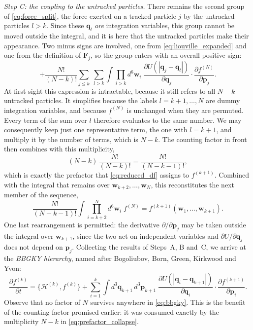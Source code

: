 \documentclass[12pt]{article}
\renewcommand{\vec}[1]{\bm{#1}}
\begin{document}
\emph{Step C: the coupling to the untracked particles.}  There remains
the second group of \eqref{eq:force_split}, the force exerted on a
tracked particle $j$ by the untracked particles $l>k$.  Since these
$\vec q_l$ \emph{are} integration variables, this group cannot be moved
outside the integral, and it is here that the untracked particles make
their appearance.  Two minus signs are involved, one from
\eqref{eq:liouville_expanded} and one from the definition of
$\vec F_j$, so the group enters with an overall positive sign:
%
\begin{equation}
  +\frac{N!}{(N-k)!}\sum_{j\le k}\;\sum_{l>k}\!\int\!\prod_{i>k}d^6\vec w_i\;
    \frac{\partial U(|\vec q_j-\vec q_l|)}{\partial\vec q_j}
    \cdot\frac{\partial f^{(N)}}{\partial\vec p_j}.
\end{equation}
%
At first sight this expression is intractable, because it still refers
to all $N-k$ untracked particles.  It simplifies because the labels
$l = k+1,\ldots,N$ are dummy integration variables, and because
$f^{(N)}$ is unchanged when they are permuted.  Every term of the sum
over $l$ therefore evaluates to the same number.  We may consequently
keep just one representative term, the one with $l = k+1$, and multiply
it by the number of terms, which is $N-k$.  The counting factor in
front then combines with this multiplicity,
%
\begin{equation}
  (N-k)\,\frac{N!}{(N-k)!} = \frac{N!}{(N-k-1)!},
  \label{eq:prefactor_collapse}
\end{equation}
%
which is exactly the prefactor that \eqref{eq:reduced_df} assigns to
$f^{(k+1)}$.  Combined with the integral that remains over
$\vec w_{k+2},\ldots,\vec w_N$, this reconstitutes the next member of
the sequence,
%
\begin{equation}
  \frac{N!}{(N-k-1)!}\!\int\!\prod_{i=k+2}^{N} d^6\vec w_i\; f^{(N)}
    = f^{(k+1)}(\vec w_1,\ldots,\vec w_{k+1}).
\end{equation}
%
One last rearrangement is permitted: the derivative
$\partial/\partial\vec p_j$ may be taken outside the integral over
$\vec w_{k+1}$, since the two act on independent variables and
$\partial U/\partial\vec q_j$ does not depend on $\vec p_j$.  Collecting
the results of Steps~A, B and~C, we arrive at the \emph{BBGKY
hierarchy}, named after Bogoliubov, Born, Green, Kirkwood and Yvon:
%
\begin{equation}
  \frac{\partial f^{(k)}}{\partial t} = \{\mathcal H^{(k)}, f^{(k)}\}
   + \sum_{i=1}^{k}\!\int\! d^3\vec q_{k+1}\,d^3\vec p_{k+1}\;
     \frac{\partial U(|\vec q_i - \vec q_{k+1}|)}{\partial \vec q_i}
     \cdot\frac{\partial f^{(k+1)}}{\partial\vec p_i}.
  \label{eq:bbgky}
\end{equation}
%
Observe that no factor of $N$ survives anywhere in \eqref{eq:bbgky}.
This is the benefit of the counting factor promised earlier: it was
consumed exactly by the multiplicity $N-k$ in
\eqref{eq:prefactor_collapse}.
\end{document}
